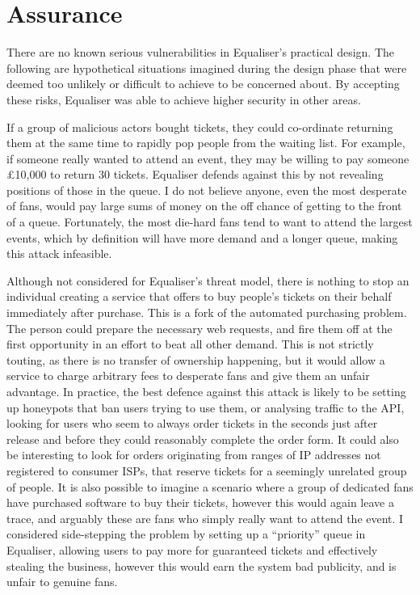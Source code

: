 \documentclass[12pt,a4paper]{bhamdissertation}
\begin{document}
\section{Assurance}

There are no known serious vulnerabilities in Equaliser's practical design. The following are hypothetical situations imagined during the design phase that were deemed too unlikely or difficult to achieve to be concerned about. By accepting these risks, Equaliser was able to achieve higher security in other areas.

If a group of malicious actors bought tickets, they could co-ordinate returning them at the same time to rapidly pop people from the waiting list. For example, if someone really wanted to attend an event, they may be willing to pay someone £10,000 to return 30 tickets. Equaliser defends against this by not revealing positions of those in the queue. I do not believe anyone, even the most desperate of fans, would pay large sums of money on the off chance of getting to the front of a queue. Fortunately, the most die-hard fans tend to want to attend the largest events, which by definition will have more demand and a longer queue, making this attack infeasible.

Although not considered for Equaliser's threat model, there is nothing to stop an individual creating a service that offers to buy people's tickets on their behalf immediately after purchase. This is a fork of the automated purchasing problem. The person could prepare the necessary web requests, and fire them off at the first opportunity in an effort to beat all other demand. This is not strictly touting, as there is no transfer of ownership happening, but it would allow a service to charge arbitrary fees to desperate fans and give them an unfair advantage. In practice, the best defence against this attack is likely to be setting up honeypots that ban users trying to use them, or analysing traffic to the API, looking for users who seem to always order tickets in the seconds just after release and before they could reasonably complete the order form. It could also be interesting to look for orders originating from ranges of IP addresses not registered to consumer ISPs, that reserve tickets for a seemingly unrelated group of people. It is also possible to imagine a scenario where a group of dedicated fans have purchased software to buy their tickets, however this would again leave a trace, and arguably these are fans who simply really want to attend the event. I considered side-stepping the problem by setting up a ``priority'' queue in Equaliser, allowing users to pay more for guaranteed tickets and effectively stealing the business, however this would earn the system bad publicity, and is unfair to genuine fans.
\end{document}
